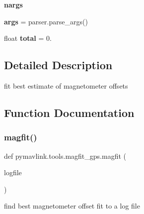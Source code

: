 \begin{DoxyCompactItemize}
{\bfseries nargs}
\item 
\mbox{\label{namespacepymavlink_1_1tools_1_1magfit__gps_a09012c05af1eb5cdb7501a4de3f35bdb}} 
{\bfseries args} = parser.\+parse\+\_\+args()
\item 
\mbox{\label{namespacepymavlink_1_1tools_1_1magfit__gps_a1e7c162e0833dfd689228f0efe1766c1}} 
float {\bfseries total} = 0.
\end{DoxyCompactItemize}


\subsection{Detailed Description}
\begin{DoxyVerb}fit best estimate of magnetometer offsets
\end{DoxyVerb}
 

\subsection{Function Documentation}
\mbox{\label{namespacepymavlink_1_1tools_1_1magfit__gps_a0d9ad9596239f056f8067ad0aa07409a}} 
\subsubsection{\texorpdfstring{magfit()}{magfit()}}
{\footnotesize\ttfamily def pymavlink.\+tools.\+magfit\+\_\+gps.\+magfit (\begin{DoxyParamCaption}\item[{}]{logfile }\end{DoxyParamCaption})}

\begin{DoxyVerb}find best magnetometer offset fit to a log file\end{DoxyVerb}
 